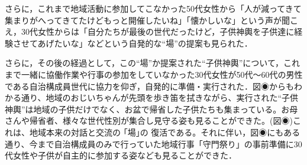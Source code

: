 \documentclass[a4paper]{jsarticle}
\begin{document}
さらに，これまで地域活動に参加してこなかった50代女性から「人が減ってきて集まりがへってきてたけどもっと開催したいね」「懐かしいな」という声が聞こえ，30代女性からは「自分たちが最後の世代だったけど，子供神輿を子供達に経験させてあげたいな」などという自発的な“場”の提案も見られた．\par
さらに，その後の経過として，この“場”か提案された“子供神輿”について，これまで一緒に協働作業や行事の参加をしていなかった30代女性が50代〜60代の男性である自治構成員世代に協力を仰ぎ，自発的に準備・実行された．図◉からもわかる通り、地域のおじいちゃんが先頭を歩き笛を拭きながら、実行された“子供神輿”は地域の子供だけでなく、お盆で帰省した子供たちも集まっている。お母さんや帰省者、様々な世代性別が集合し見守る姿も見ることができた。(図◉)これは、地域本来の対話と交流の ｢場｣の 復活である。それに伴い，図◉にもある通り、今まで自治構成員のみで行っていた地域行事「守門祭り」の事前準備に30代女性や子供が自主的に参加する姿なども見ることができた．
\end{document}
